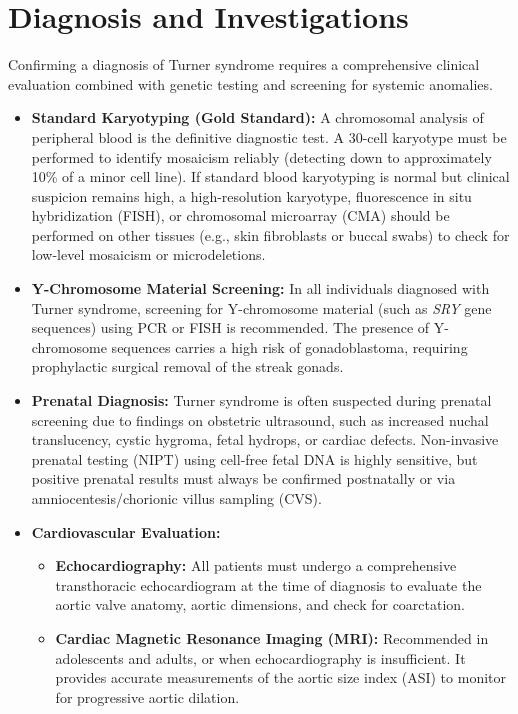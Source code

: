 \section*{Diagnosis and Investigations}
Confirming a diagnosis of Turner syndrome requires a comprehensive clinical evaluation combined with genetic testing and screening for systemic anomalies.
\begin{itemize}
    \item \textbf{Standard Karyotyping (Gold Standard):} A chromosomal analysis of peripheral blood is the definitive diagnostic test. A 30-cell karyotype must be performed to identify mosaicism reliably (detecting down to approximately 10\% of a minor cell line). If standard blood karyotyping is normal but clinical suspicion remains high, a high-resolution karyotype, fluorescence in situ hybridization (FISH), or chromosomal microarray (CMA) should be performed on other tissues (e.g., skin fibroblasts or buccal swabs) to check for low-level mosaicism or microdeletions.
    \item \textbf{Y-Chromosome Material Screening:} In all individuals diagnosed with Turner syndrome, screening for Y-chromosome material (such as \textit{SRY} gene sequences) using PCR or FISH is recommended. The presence of Y-chromosome sequences carries a high risk of gonadoblastoma, requiring prophylactic surgical removal of the streak gonads.
    \item \textbf{Prenatal Diagnosis:} Turner syndrome is often suspected during prenatal screening due to findings on obstetric ultrasound, such as increased nuchal translucency, cystic hygroma, fetal hydrops, or cardiac defects. Non-invasive prenatal testing (NIPT) using cell-free fetal DNA is highly sensitive, but positive prenatal results must always be confirmed postnatally or via amniocentesis/chorionic villus sampling (CVS).
    \item \textbf{Cardiovascular Evaluation:}
    \begin{itemize}
        \item \textbf{Echocardiography:} All patients must undergo a comprehensive transthoracic echocardiogram at the time of diagnosis to evaluate the aortic valve anatomy, aortic dimensions, and check for coarctation.
        \item \textbf{Cardiac Magnetic Resonance Imaging (MRI):} Recommended in adolescents and adults, or when echocardiography is insufficient. It provides accurate measurements of the aortic size index (ASI) to monitor for progressive aortic dilation.
    \end{itemize}

\end{itemize}
